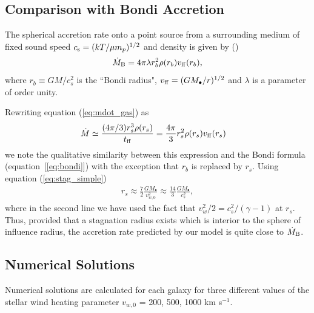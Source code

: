 \documentclass[usenatbib,fleqn]{mn2e}
\newcommand{\rs}{r_s}
\newcommand{\rb}{r_b}
\newcommand{\Mbh}[1][]{M_{\bullet#1}}
\newcommand{\ff}{\rm ff}
\newcommand{\vwO}{v_{w,0}}
\begin{document}
\subsection{Comparison with Bondi Accretion}
The spherical accretion rate onto a point source from a surrounding medium of fixed sound speed $c_{\rm s} = (kT/\mu m_p)^{1/2}$ and density is given by (\citealt{Bondi52}) 
\begin{align}
  \dot{M}_{\rm B} =4\pi \lambda r_b^2 \rho(r_b) v_{\rm ff}(r_b),
\label{eq:bondi}
\end{align}
where $r_b \equiv GM/c_{s}^{2}$ is the ``Bondi radius", $v_{\rm ff} = (GM_{\bullet}/r)^{1/2}$ and $\lambda$ is a parameter of order unity.  

Rewriting equation (\ref{eq:mdot_gas}) as
\begin{align}
  &\dot{M}\simeq\frac{(4 \pi/3) \rs^3 \rho(\rs)}{t_{\ff}} =\frac{4 \pi}{3} \rs^2 \rho(\rs) v_{\ff}(\rs)
\end{align}
we note the qualitative similarity between this expression and the Bondi formula (equation~[\ref{eq:bondi}]) with the exception that $\rb$ is replaced by $\rs$.  Using equation (\ref{eq:stag_simple})
\begin{align}
  \rs\approx\frac{7}{2}\frac{G \Mbh}{\vwO^2} \approx \frac{14}{3}\frac{GM_{\bullet}}{c_{s}^{2}},
  \label{eq:rs_simple}
\end{align}
where in the second line we have used the fact that $v_{w}^{2}/2 =
c_s^2/(\gamma-1)$ at $\rs$.  Thus, provided that a stagnation radius
exists which is interior to the sphere of influence radius, the
accretion rate predicted by our model is quite close to $\dot{M}_{\rm
  B}$.



\subsection{Numerical Solutions}

Numerical solutions are calculated for each galaxy for three different values of the stellar wind heating parameter $v_{w,0}$ = 200, 500, 1000 km s$^{-1}$.  
\end{document}
